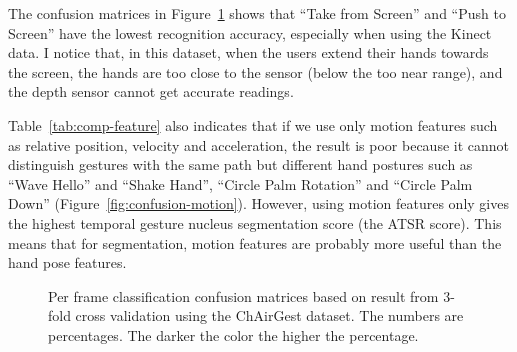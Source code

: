 The confusion matrices in Figure~\ref{fig:confusion2} shows that ``Take
from Screen'' and ``Push to Screen'' have the lowest recognition accuracy,
especially when using the Kinect data. I notice that, in this dataset, when the
users extend their hands towards the screen, the hands are too close to the sensor (below the too near range), and the depth sensor cannot get accurate readings.

Table~\ref{tab:comp-feature} also indicates that if we use only motion features
such as relative position, velocity and acceleration, the result is poor because it cannot distinguish gestures with
the same path but different hand postures such as ``Wave Hello'' and ``Shake
Hand'', ``Circle Palm Rotation'' and ``Circle Palm Down''
(Figure~\ref{fig:confusion-motion}). However, using motion features only gives
the highest temporal gesture nucleus segmentation score (the ATSR score). This
means that for segmentation, motion features are probably more useful than the
hand pose features.

\begin{figure}[!hp]
\centering
{}
\caption{Per frame
classification confusion matrices based on result from 3-fold cross validation
using the ChAirGest dataset. The numbers are percentages. The darker
the color the higher the percentage.}
\label{fig:confusion2}
\end{figure}

